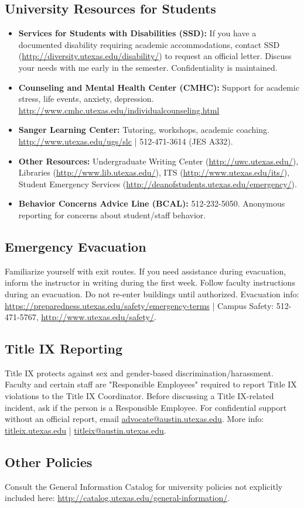 \documentclass[11pt,fourier]{article}
\begin{document}
\subsection*{University Resources for Students}
\begin{itemize}
    \item \textbf{Services for Students with Disabilities (SSD):} If you have a documented disability requiring academic accommodations, contact SSD (\url{http://diversity.utexas.edu/disability/}) to request an official letter. Discuss your needs with me early in the semester. Confidentiality is maintained.
    \item \textbf{Counseling and Mental Health Center (CMHC):} Support for academic stress, life events, anxiety, depression. \url{http://www.cmhc.utexas.edu/individualcounseling.html}
    \item \textbf{Sanger Learning Center:} Tutoring, workshops, academic coaching. \url{http://www.utexas.edu/ugs/slc} | 512-471-3614 (JES A332).
    \item \textbf{Other Resources:} Undergraduate Writing Center (\url{http://uwc.utexas.edu/}), Libraries (\url{http://www.lib.utexas.edu/}), ITS (\url{http://www.utexas.edu/its/}), Student Emergency Services (\url{http://deanofstudents.utexas.edu/emergency/}).
    \item \textbf{Behavior Concerns Advice Line (BCAL):} 512-232-5050. Anonymous reporting for concerns about student/staff behavior.
\end{itemize}

\subsection*{Emergency Evacuation}
Familiarize yourself with exit routes. If you need assistance during evacuation, inform the instructor in writing during the first week. Follow faculty instructions during an evacuation. Do not re-enter buildings until authorized. Evacuation info: \url{https://preparedness.utexas.edu/safety/emergency-terms} | Campus Safety: 512-471-5767, \url{http://www.utexas.edu/safety/}.

\subsection*{Title IX Reporting}
Title IX protects against sex and gender-based discrimination/harassment. Faculty and certain staff are "Responsible Employees" required to report Title IX violations to the Title IX Coordinator. Before discussing a Title IX-related incident, ask if the person is a Responsible Employee. For confidential support without an official report, email \href{mailto:advocate@austin.utexas.edu}{advocate@austin.utexas.edu}. More info: \url{titleix.utexas.edu} | \href{mailto:titleix@austin.utexas.edu}{titleix@austin.utexas.edu}.

\subsection*{Other Policies}
Consult the General Information Catalog for university policies not explicitly included here: \url{http://catalog.utexas.edu/general-information/}.
\end{document}
